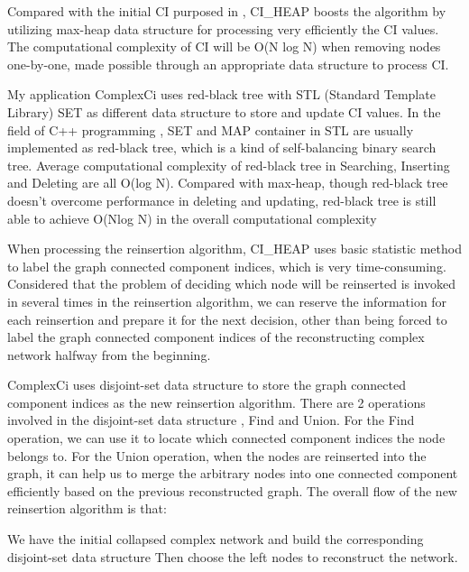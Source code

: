 \documentclass{article}
\begin{document}
	\begin{enumerate}
	\begin{item}
		Compared with the initial CI purposed in \cite{morone2015influence}, CI\_HEAP boosts the algorithm by utilizing max-heap data structure for processing very efficiently the CI values. The computational complexity of CI will be O(N log N) when removing nodes one-by-one, made possible through an appropriate data structure to process CI. 
		
		My application ComplexCi uses red-black tree with STL (Standard Template Library) SET as different data structure to store and update CI values. In the field of C++ programming , SET and MAP container in STL are usually implemented as red-black tree, which is a kind of self-balancing binary search tree. Average computational complexity of red-black tree in Searching, Inserting and Deleting are all O(log N). Compared with max-heap, though red-black tree doesn’t overcome performance in deleting and updating, red-black tree is still able to achieve O(Nlog N) in the overall computational complexity 
	\end{item}
	\begin{item}
		When processing the reinsertion algorithm, CI\_HEAP uses basic statistic method to label the graph connected component indices, which is very time-consuming. Considered that the problem of deciding which node will be reinserted is invoked in several times in the reinsertion algorithm, we can reserve the information for each reinsertion and prepare it for the next decision, other than being forced to label the graph connected component indices of the reconstructing complex network halfway from the beginning.
		
		ComplexCi uses disjoint-set data structure to store the graph connected component indices as the new reinsertion algorithm. There are 2 operations involved in the disjoint-set data structure , Find and Union. For the Find operation, we can use it to locate which connected component indices the node belongs to. For the Union operation, when the nodes are reinserted into the graph, it can help us to merge the arbitrary nodes into one connected component efficiently based on the previous reconstructed graph. The overall flow of the new reinsertion algorithm is that:


\begin{algorithm}
	\begin{algorithmic}[1]
		\STATE We have the initial collapsed complex network and build the corresponding disjoint-set data structure
		\STATE Then choose the left nodes to reconstruct the network.
		\STATE 
		

\end{algorithmic}
\end{algorithm}
\end{item}
\end{enumerate}
\end{document}
